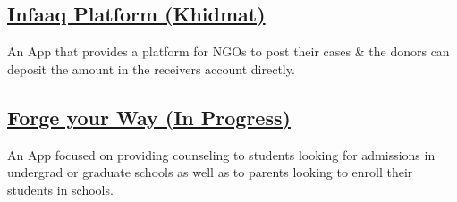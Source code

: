 \documentclass[]{m abbas resume' 2022}
\begin{document}
\begin{minipage}[t]{0.39\textwidth}
    \subsection{\href{https://github.com/smabbasht/Infaaq_app}{\textbf{Infaaq Platform (Khidmat)}}}
    An App that provides a platform for NGOs to post their cases \& the donors can deposit the amount in the receivers account directly.
    
    \subsection{\href{}{\textbf{Forge your Way (In Progress)}}}
    An App focused on providing counseling to students looking for admissions in undergrad or graduate schools as well as to parents looking to enroll their students in schools.

    
    
    

\end{minipage}
\end{document}
